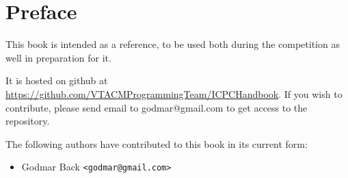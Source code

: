 \chapter{Preface}

This book is intended as a reference, to be used both during the competition as well
in preparation for it.

It is hosted on github at
\href{https://github.com/VTACMProgrammingTeam/ICPCHandbook}{https://github.com/VTACMProgrammingTeam/ICPCHandbook}.
If you wish to contribute, please send email to godmar@gmail.com to get access to the repository.

The following authors have contributed to this book in its current form:
\begin{itemize}
    \item Godmar Back \texttt{<godmar@gmail.com>}
\end{itemize}
